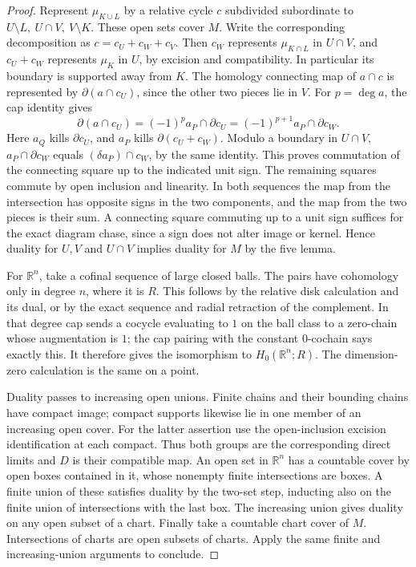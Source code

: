 \documentclass[11pt,oneside,openany]{book}
\theoremstyle{plain}
\theoremstyle{definition}
\theoremstyle{remark}
\begin{document}
\begin{proof}
Represent \(\mu_{K\cup L}\) by a relative cycle \(c\)
subdivided subordinate to \(U\setminus L,\ U\cap V,\
V\setminus K\). These open sets cover \(M\). Write the
corresponding decomposition as \(c=c_U+c_W+c_V\).
Then \(c_W\) represents \(\mu_{K\cap L}\) in \(U\cap V\),
and \(c_U+c_W\) represents \(\mu_K\) in \(U\), by excision
and compatibility. In particular its boundary is supported
away from \(K\). The homology connecting map of \(a\cap c\)
is represented by \(\partial(a\cap c_U)\), since the other
two pieces lie in \(V\). For \(p=\deg a\), the cap identity
gives
\[
 \partial(a\cap c_U)
 =(-1)^p a_P\cap\partial c_U
 =(-1)^{p+1}a_P\cap\partial c_W .
\]
Here \(a_Q\) kills \(\partial c_U\), and \(a_P\) kills
\(\partial(c_U+c_W)\). Modulo a boundary in \(U\cap V\),
\(a_P\cap\partial c_W\) equals \((\delta a_P)\cap c_W\),
by the same identity. This proves commutation of the
connecting square up to the indicated unit sign. The
remaining squares commute by open inclusion and linearity.
In both sequences the map from the intersection has opposite
signs in the two components, and the map from the two pieces
is their sum. A connecting square commuting up to a unit
sign suffices for the exact diagram chase, since a sign
does not alter image or kernel. Hence duality for \(U,V\)
and \(U\cap V\) implies duality for \(M\) by the five lemma.

For \(\mathbb R^n\), take a cofinal sequence of large closed
balls. The pairs have cohomology only in degree \(n\),
where it is \(R\). This follows by the relative disk
calculation and its dual, or by the exact sequence and
radial retraction of the complement. In that degree
cap sends a cocycle evaluating to \(1\) on the ball
class to a zero-chain whose augmentation is \(1\);
the cap pairing with the constant \(0\)-cochain says
exactly this. It therefore gives the isomorphism to
\(H_0(\mathbb R^n;R)\). The dimension-zero calculation
is the same on a point.

Duality passes to increasing open unions. Finite chains and
their bounding chains have compact image; compact supports
likewise lie in one member of an increasing open cover.
For the latter assertion use the open-inclusion excision
identification at each compact. Thus both groups are the
corresponding direct limits and \(D\) is their compatible
map. An open set in \(\mathbb R^n\) has a countable cover
by open boxes contained in it, whose nonempty finite
intersections are boxes. A finite union of these satisfies
duality by the two-set step, inducting also on the finite
union of intersections with the last box. The increasing
union gives duality on any open subset of a chart. Finally
take a countable chart cover of \(M\). Intersections of
charts are open subsets of charts. Apply the same finite
and increasing-union arguments to conclude.
\end{proof}
\end{document}
